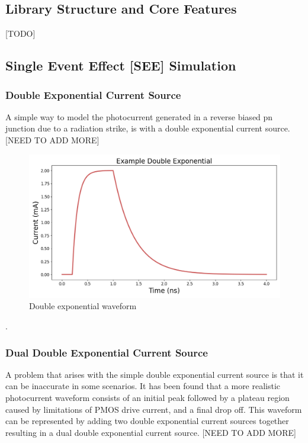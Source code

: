 \documentclass[conference]{IEEEtran}
\begin{document}
\subsection{Library Structure and Core Features}
[TODO]

\vspace{1em}
\subsection{Single Event Effect [SEE] Simulation}
\subsubsection{Double Exponential Current Source}
A simple way to model the photocurrent generated in a reverse biased pn junction due to a radiation strike, is with a double exponential current source. [NEED TO ADD MORE]

\begin{figure}[htbp]
\centering
\includegraphics[width=0.95\linewidth]{EX_Double_Exponential.png}
\caption{Double exponential waveform}
\label{fig:double_exp}
\end{figure}

\cite{Pepper1990}.

\subsubsection{Dual Double Exponential Current Source}
A problem that arises with the simple double exponential current source is that it can be inaccurate in some scenarios. It has been found that a more realistic photocurrent waveform consists of an initial peak followed by a plateau region caused by limitations of PMOS drive current, and a final drop off. This waveform can be represented by adding two double exponential current sources together resulting in a dual double exponential current source. [NEED TO ADD MORE]
\end{document}
